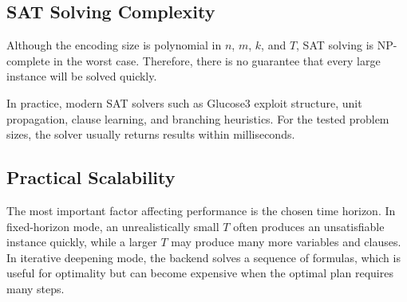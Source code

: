 \subsection{SAT Solving Complexity} \label{subsec:sat-solving-complexity}

\noindent Although the encoding size is polynomial in $n$, $m$, $k$, and $T$, SAT solving is NP-complete in the worst case.
Therefore, there is no guarantee that every large instance will be solved quickly.

\noindent In practice, modern SAT solvers such as Glucose3 exploit structure, unit propagation, clause learning, and branching heuristics.
For the tested problem sizes, the solver usually returns results within milliseconds.

\subsection{Practical Scalability} \label{subsec:practical-scalability}

The most important factor affecting performance is the chosen time horizon.
In fixed-horizon mode, an unrealistically small $T$ often produces an unsatisfiable instance quickly, while a larger $T$ may produce many more variables and clauses.
In iterative deepening mode, the backend solves a sequence of formulas, which is useful for optimality but can become expensive when the optimal plan requires many steps.